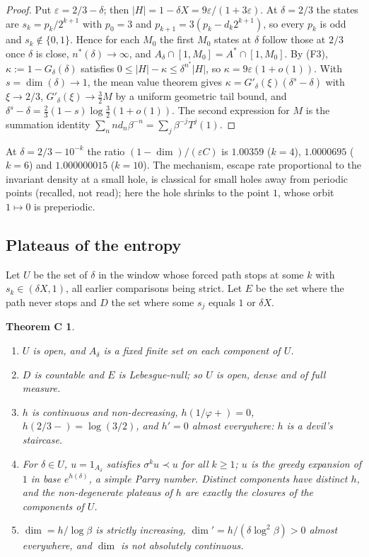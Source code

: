 \documentclass[11pt]{amsart}
\newtheorem*{thmC}{Theorem C}
\theoremstyle{remark}
\begin{document}
\begin{proof}
Put $\varepsilon=2/3-\delta$; then $|H|=1-\delta X=9\varepsilon/(1+3\varepsilon)$. At $\delta=2/3$ the states are $s_k=p_k/2^{k+1}$ with $p_0=3$ and $p_{k+1}=3(p_k-d_k2^{k+1})$, so every $p_k$ is odd and $s_k\notin\{0,1\}$. Hence for each $M_0$ the first $M_0$ states at $\delta$ follow those at $2/3$ once $\delta$ is close, $n^*(\delta)\to\infty$, and $A_\delta\cap[1,M_0]=A^*\cap[1,M_0]$. By (F3), $\kappa:=1-G_\delta(\delta)$ satisfies $0\le|H|-\kappa\le\delta^{n^*}|H|$, so $\kappa=9\varepsilon(1+o(1))$. With $s=\dim(\delta)\to1$, the mean value theorem gives $\kappa=G'_\delta(\xi)(\delta^s-\delta)$ with $\xi\to2/3$, $G'_\delta(\xi)\to\frac32M$ by a uniform geometric tail bound, and $\delta^s-\delta=\frac23(1-s)\log\frac32(1+o(1))$. The second expression for $M$ is the summation identity $\sum_nnd_n\beta^{-n}=\sum_j\beta^{-j}T^j(1)$.
\end{proof}

At $\delta=2/3-10^{-k}$ the ratio $(1-\dim)/(\varepsilon C)$ is $1.00359$ ($k=4$), $1.0000695$ ($k=6$) and $1.000000015$ ($k=10$). The mechanism, escape rate proportional to the invariant density at a small hole, is classical for small holes away from periodic points (recalled, not read); here the hole shrinks to the point $1$, whose orbit $1\mapsto0$ is preperiodic.

\subsection{Plateaus of the entropy}
Let $U$ be the set of $\delta$ in the window whose forced path stops at some $k$ with $s_k\in(\delta X,1)$, all earlier comparisons being strict. Let $E$ be the set where the path never stops and $D$ the set where some $s_j$ equals $1$ or $\delta X$.

\begin{thmC}
\begin{enumerate}
\item $U$ is open, and $A_\delta$ is a fixed finite set on each component of $U$.
\item $D$ is countable and $E$ is Lebesgue-null; so $U$ is open, dense and of full measure.
\item $h$ is continuous and non-decreasing, $h(1/\varphi+)=0$, $h(2/3-)=\log(3/2)$, and $h'=0$ almost everywhere: $h$ is a devil's staircase.
\item For $\delta\in U$, $u=1_{A_\delta}$ satisfies $\sigma^ku\prec u$ for all $k\ge1$; $u$ is the greedy expansion of $1$ in base $e^{h(\delta)}$, a simple Parry number. Distinct components have distinct $h$, and the non-degenerate plateaus of $h$ are exactly the closures of the components of $U$.
\item $\dim=h/\log\beta$ is strictly increasing, $\dim'=h/(\delta\log^2\beta)>0$ almost everywhere, and $\dim$ is not absolutely continuous.
\end{enumerate}
\end{thmC}
\end{document}
